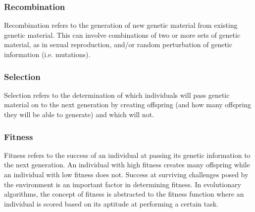 \subsubsection{Recombination}

Recombination refers to the generation of new genetic material from existing genetic material. This can involve combinations of two or more sets of genetic material, as in sexual reproduction, and/or random perturbation of genetic information (i.e. mutations).

\subsubsection{Selection}

Selection refers to the determination of which individuals will pass genetic material on to the next generation by creating offspring (and how many offspring they will be able to generate) and which will not.

\subsubsection{Fitness}

Fitness refers to the success of an individual at passing its genetic information to the next generation. An individual with high fitness creates many offspring while an individual with low fitness does not. Success at surviving challenges posed by the environment is an important factor in determining fitness. In evolutionary algorithms, the concept of fitness is abstracted to the fitness function where an individual is scored based on its aptitude at performing a certain task.